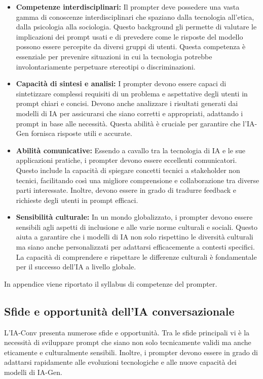         \begin{itemize}
          \item \textbf{Competenze interdisciplinari:} Il prompter deve possedere una vasta gamma di conoscenze interdisciplinari che spaziano dalla tecnologia all'etica, dalla psicologia alla sociologia. Questo background gli permette di valutare le implicazioni dei prompt usati e di prevedere come le risposte del modello possono essere percepite da diversi gruppi di utenti. Questa competenza è essenziale per prevenire situazioni in cui la tecnologia potrebbe involontariamente perpetuare stereotipi o discriminazioni.
          \item \textbf{Capacità di sintesi e analisi:} I prompter devono essere capaci di sintetizzare complessi requisiti di un problema e aspettative degli utenti in prompt chiari e concisi. Devono anche analizzare i risultati generati dai modelli di IA per assicurarsi che siano corretti e appropriati, adattando i prompt in base alle necessità. Questa abilità è cruciale per garantire che l'IA-Gen fornisca risposte utili e accurate.
          \item \textbf{Abilità comunicative:} Essendo a cavallo tra la tecnologia di IA e le sue applicazioni pratiche, i prompter devono essere eccellenti comunicatori. Questo include la capacità di spiegare concetti tecnici a stakeholder non tecnici, facilitando così una migliore comprensione e collaborazione tra diverse parti interessate. Inoltre, devono essere in grado di tradurre feedback e richieste degli utenti in prompt efficaci.
          \item \textbf{Sensibilità culturale:} In un mondo globalizzato, i prompter devono essere sensibili agli aspetti di inclusione e alle varie norme culturali e sociali. Questo aiuta a garantire che i modelli di IA non solo rispettino le diversità culturali ma siano anche personalizzati per adattarsi efficacemente a contesti specifici. La capacità di comprendere e rispettare le differenze culturali è fondamentale per il successo dell'IA a livello globale.
        \end{itemize}
        In appendice viene riportato il syllabus di competenze del prompter.
 
    \subsection{Sfide e opportunità dell’IA conversazionale}
        L’IA-Conv presenta numerose sfide e opportunità. Tra le sfide principali vi è la necessità di sviluppare prompt che siano non solo tecnicamente validi ma anche eticamente e culturalmente sensibili. Inoltre, i prompter devono essere in grado di adattarsi rapidamente alle evoluzioni tecnologiche e alle nuove capacità dei modelli di IA-Gen.
    
